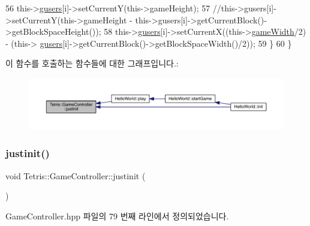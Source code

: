 \begin{DoxyCode}
56                         this->\hyperlink{class_tetris_1_1_game_controller_a1a31d3a933daad6d95e20458eea2900e}{gusers}[i]->setCurrentY(this->gameHeight);
57                         \textcolor{comment}{//this->gusers[i]->setCurrentY(this->gameHeight -
       this->gusers[i]->getCurrentBlock()->getBlockSpaceHeight());}
58                         this->\hyperlink{class_tetris_1_1_game_controller_a1a31d3a933daad6d95e20458eea2900e}{gusers}[i]->setCurrentX((this->\hyperlink{class_tetris_1_1_game_controller_a439f215918db4127fcb44cf9d501ed63}{gameWidth}/2) - (this->
      \hyperlink{class_tetris_1_1_game_controller_a1a31d3a933daad6d95e20458eea2900e}{gusers}[i]->getCurrentBlock()->getBlockSpaceWidth()/2));
59                     \}
60             \}
\end{DoxyCode}
이 함수를 호출하는 함수들에 대한 그래프입니다.\+:
\nopagebreak
\begin{figure}[H]
\begin{center}
\leavevmode
\includegraphics[width=350pt]{db/dd2/class_tetris_1_1_game_controller_aef406397d4719c9edd49774d0343ce05_icgraph}
\end{center}
\end{figure}
\mbox{\label{class_tetris_1_1_game_controller_aef406397d4719c9edd49774d0343ce05}} 
\subsubsection{\texorpdfstring{justinit()}{justinit()}\hspace{0.1cm}{\footnotesize\ttfamily [2/2]}}
{\footnotesize\ttfamily void Tetris\+::\+Game\+Controller\+::justinit (\begin{DoxyParamCaption}{ }\end{DoxyParamCaption})\hspace{0.3cm}{\ttfamily [inline]}}



Game\+Controller.\+hpp 파일의 79 번째 라인에서 정의되었습니다.


